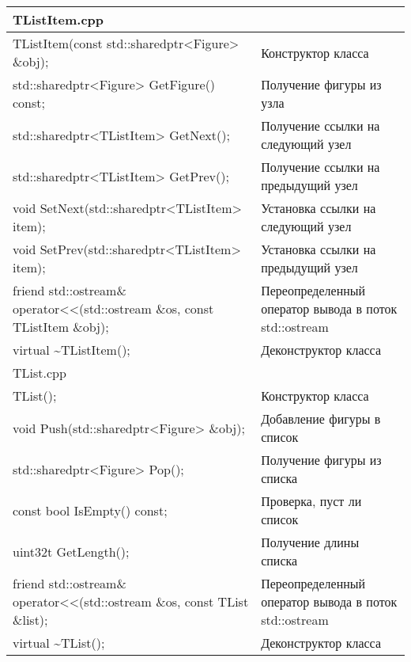\begin{longtable}{|p{7.5cm}|p{7.5cm}|}
\rowcolor{lightgray}
\multicolumn{2}{|c|} {TListItem.cpp}\\
\hline
TListItem(const std::sharedptr<Figure> \&obj);&Конструктор класса\\
\hline
std::sharedptr<Figure> GetFigure() const;&Получение фигуры из узла\\
\hline
std::sharedptr<TListItem> GetNext();&Получение ссылки на следующий узел\\
\hline
std::sharedptr<TListItem> GetPrev();&Получение ссылки на предыдущий узел\\
\hline
void SetNext(std::sharedptr<TListItem> item);&Установка ссылки на следующий узел\\
\hline
void SetPrev(std::sharedptr<TListItem> item);&Установка ссылки на предыдущий узел\\
\hline
friend std::ostream\& operator<<(std::ostream \&os, const TListItem \&obj);&Переопределенный оператор вывода в поток std::ostream\\
\hline
virtual \textasciitilde TListItem(){};&Деконструктор класса\\
\hline
\rowcolor{lightgray}
\multicolumn{2}{|c|} {TList.cpp}\\
\hline
TList();&Конструктор класса\\
\hline
void Push(std::sharedptr<Figure> \&obj);&Добавление фигуры в список\\
\hline
std::sharedptr<Figure> Pop();&Получение фигуры из списка\\
\hline
const bool IsEmpty() const;&Проверка, пуст ли список\\
\hline
uint32t GetLength();&Получение длины списка\\
\hline
friend std::ostream\& operator<<(std::ostream \&os, const TList \&list);&Переопределенный оператор вывода в поток std::ostream\\
\hline
virtual \textasciitilde TList();&Деконструктор класса\\
\hline
\end{longtable}


